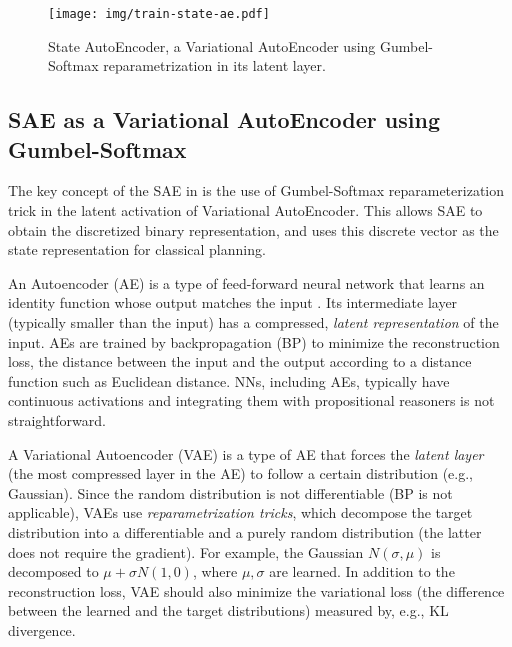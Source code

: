 \begin{figure}[htb]
 \texttt{[image: img/train-state-ae.pdf]}
 \caption{State AutoEncoder, a
 Variational AutoEncoder \cite{kingma2014semi} using Gumbel-Softmax \cite{jang2016categorical} reparametrization in its
 latent layer.}
 \label{sae}
\end{figure}

\subsection{SAE as a Variational AutoEncoder using Gumbel-Softmax}

The key concept of the SAE in \latentplanner is the use of Gumbel-Softmax \cite{jang2016categorical}
reparameterization trick in the latent activation of Variational AutoEncoder.
This allows SAE to obtain the
discretized binary representation, and \latentplanner uses this
discrete vector as the state representation for classical planning.

An Autoencoder (AE) is a type of feed-forward neural network that learns an identity function whose output matches the input \cite{hinton2006reducing}.
Its intermediate layer (typically smaller than the input) has a compressed, \emph{latent representation} of the input.
AEs are trained by backpropagation (BP) to minimize the reconstruction loss, the distance between the input and the output according to a distance function such as Euclidean distance.
NNs, including AEs, typically have continuous activations and integrating them with propositional reasoners is not straightforward.

A Variational Autoencoder (VAE) \cite{kingma2013auto} is a type of AE that forces the \emph{latent layer} (the most compressed layer in the AE) to follow a certain distribution (e.g., Gaussian).
Since the random distribution is not differentiable (BP is not applicable), VAEs use \emph{reparametrization tricks}, which decompose the target distribution into a differentiable and a purely random distribution (the latter does not require the gradient).
For example, the Gaussian $N(\sigma,\mu)$ is decomposed to $\mu+\sigma N(1,0)$, where $\mu,\sigma$ are learned.
In addition to the reconstruction loss, VAE should also minimize the variational loss (the difference between the learned and the target distributions) measured by, e.g.,  KL divergence.

